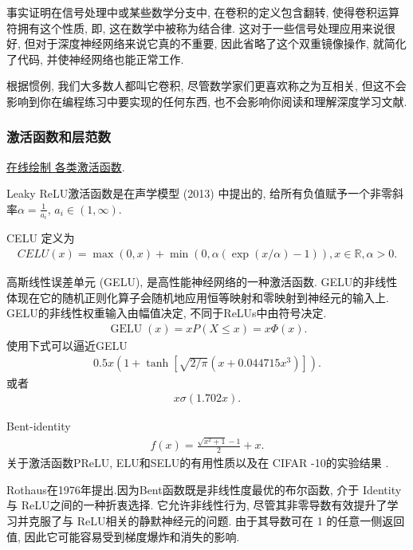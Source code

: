 事实证明在信号处理中或某些数学分支中, 在卷积的定义包含翻转, 使得卷积运算符拥有这个性质, 即, 这在数学中被称为结合律. 这对于一些信号处理应用来说很好, 但对于深度神经网络来说它真的不重要, 因此省略了这个双重镜像操作, 就简化了代码, 并使神经网络也能正常工作.

根据惯例, 我们大多数人都叫它卷积, 尽管数学家们更喜欢称之为互相关, 但这不会影响到你在编程练习中要实现的任何东西, 也不会影响你阅读和理解深度学习文献.

\subsubsection{激活函数和层范数}
\href{https://dashee87.github.io/deep\%20learning/visualising-activation-functions-in-neural-networks/}{在线绘制 各类激活函数}.
\begin{remark}
Leaky ReLU激活函数是在声学模型 (2013) 中提出的, 给所有负值赋予一个非零斜率$\alpha=\frac 1 {a_i},\, a_i\in (1,\infty)$.
\end{remark}
\begin{remark}
    CELU \cite{hendrycks2016gelu} 定义为
\begin{align}
    CELU (x)=\max (0,x)+\min (0,\alpha (\exp (x/\alpha)-1)), x\in \mathbb R, \alpha> 0.
\end{align}
\end{remark}
\begin{remark}
    高斯线性误差单元 (GELU), 是高性能神经网络的一种激活函数. GELU的非线性体现在它的随机正则化算子会随机地应用恒等映射和零映射到神经元的输入上.
GELU的非线性权重输入由幅值决定, 不同于ReLUs中由符号决定.
\begin{align}
    \operatorname{GELU} (x)=x P (X \leq x)=x \Phi (x).
\end{align}
使用下式可以逼近GELU
\begin{align}
    0.5 x\left (1+\tanh \left[\sqrt{2 / \pi}\left (x+0.044715 x^{3}\right)\right]\right).
\end{align}
或者
\begin{align}
    x \sigma (1.702 x).
\end{align}
\end{remark}

Bent-identity 
\begin{align}
    f (x) = \frac{\sqrt{x^2 + 1} - 1}{2} +x.
\end{align}
关于激活函数PReLU, ELU和SELU的有用性质以及在 CIFAR -10的实验结果  \cite{Godfrey2019-9846}.

Rothaus在1976年提出.因为Bent函数既是非线性度最优的布尔函数, 介于 Identity 与 ReLU之间的一种折衷选择. 它允许非线性行为, 尽管其非零导数有效提升了学习并克服了与 ReLU相关的静默神经元的问题.
由于其导数可在 1 的任意一侧返回值, 因此它可能容易受到梯度爆炸和消失的影响.

